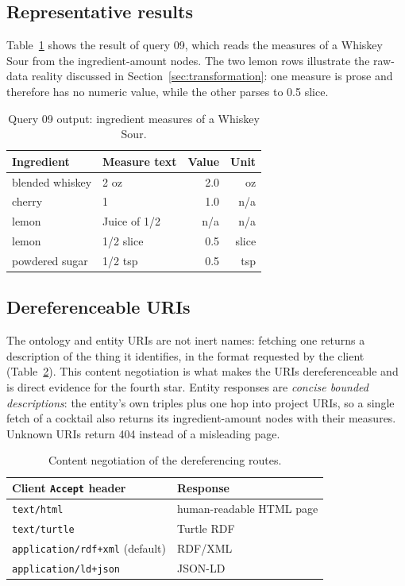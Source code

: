 \subsection{Representative results}

Table~\ref{tab:whiskey-sour} shows the result of query 09, which reads the
measures of a Whiskey Sour from the ingredient-amount nodes. The two lemon rows
illustrate the raw-data reality discussed in Section~\ref{sec:transformation}: one measure is prose
and therefore has no numeric value, while the other parses to 0.5 slice.

\begin{table}[h]
  \centering
  \small
  \begin{tabular}{@{}llrr@{}}
    \toprule
    Ingredient & Measure text & Value & Unit \\
    \midrule
    blended whiskey & 2 oz & 2.0 & oz \\
    cherry & 1 & 1.0 & n/a \\
    lemon & Juice of 1/2 & n/a & n/a \\
    lemon & 1/2 slice & 0.5 & slice \\
    powdered sugar & 1/2 tsp & 0.5 & tsp \\
    \bottomrule
  \end{tabular}
  \caption{Query 09 output: ingredient measures of a Whiskey Sour.}
  \label{tab:whiskey-sour}
\end{table}

\subsection{Dereferenceable URIs}

The ontology and entity URIs are not inert names: fetching one returns a
description of the thing it identifies, in the format requested by the client
(Table~\ref{tab:negotiation}). This content negotiation is what makes the URIs
dereferenceable and is direct evidence for the fourth star. Entity responses
are \emph{concise bounded descriptions}: the entity's own triples plus one hop
into project URIs, so a single fetch of a cocktail also returns its
ingredient-amount nodes with their measures. Unknown URIs return 404 instead of
a misleading page.

\begin{table}[h]
  \centering
  \small
  \begin{tabular}{@{}ll@{}}
    \toprule
    Client \texttt{Accept} header & Response \\
    \midrule
    \texttt{text/html} & human-readable HTML page \\
    \texttt{text/turtle} & Turtle RDF \\
    \texttt{application/rdf+xml} (default) & RDF/XML \\
    \texttt{application/ld+json} & JSON-LD \\
    \bottomrule
  \end{tabular}
  \caption{Content negotiation of the dereferencing routes.}
  \label{tab:negotiation}
\end{table}

